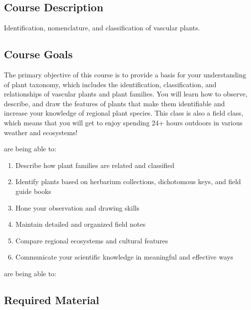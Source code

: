 \documentclass{tufte-handout}
\begin{document}
\begin{fullwidth}

\section{Course Description}

Identification, nomenclature, and classification of vascular plants. 

\subsection{Course Goals}

The primary objective of this course is to provide a basis for your understanding of plant taxonomy, which includes the identification, classification, and relationships of vascular plants and plant families. You will learn how to observe, describe, and draw the features of plants that make them identifiable and increase your knowledge of regional plant species. This class is also a field class, which means that you will get to enjoy spending 24+ hours outdoors in various weather and ecosystems!

 are being able to:

\begin{enumerate}
	\item Describe how plant families are related and classified
	\item Identify plants based on herbarium collections, dichotomous keys, and field guide books
	\item Hone your observation and drawing skills
	\item Maintain detailed and organized field notes
	\item Compare regional ecosystems and cultural features
	\item Communicate your scientific knowledge in meaningful and effective ways
\end{enumerate}

 are being able to: 

\vspace{1.5cm}


\subsection{Required Material}


\end{fullwidth}
\end{document}
